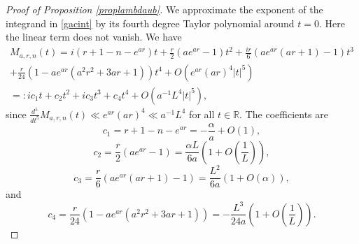 \documentclass[10pt,a4paper]{amsart}
\begin{document}
\begin{proof}[Proof of Proposition \ref{proplambdaub}]
We approximate the exponent of the integrand in \eqref{gacint} by its fourth degree Taylor polynomial around $t=0$.
Here the linear term does not vanish.
We have
\begin{multline*}
M_{a,r,n}(t) = i  \left(r+1-n-e^{ar}\right)t
+\frac{r}{2}  \left(a e^{a r}-1\right) t^2
+ \frac{i r}{6} \left(a  e^{a r} (a r+1)-1\right) t^3 \\
+ \frac{r}{24}\left(1-a  e^{a r} \left(a^2 r^2+3 a r+1\right)\right) t^4 
+O(e^{ar} (ar)^4 |t|^5) \\
=: ic_1 t+ c_{2} t^2+ i  c_{3} t^3+  c_{4} t^4 +O( a^{-1} L^4 |t|^5),
\end{multline*}
since $\frac{d^5}{dt^5} M_{a,r,n}(t) \ll e^{ar} (ar)^4 \ll a^{-1} L^4$ for all $t\in \mathbb{R}$.
The coefficients are
$$
c_1 = r+1-n-e^{ar}= -\frac{\alpha}{a} +O(1),
$$
$$
c_2= \frac{r}{2}  \left(a e^{a r}-1\right)
=\frac{\alpha L}{6a}\left(1+O\left(\frac{1}{L}\right)\right),
$$
$$
c_3= \frac{r}{6} \left(a  e^{a r} (a r+1)-1\right) = \frac{L^2}{6a} ( 1+ O(\alpha)),
$$
and
$$
c_4 =  \frac{r}{24}\left(1-a  e^{a r} \left(a^2 r^2+3 a r+1\right)\right) = -\frac{L^3}{24 a} \left(1+O\left(\frac{1}{L}\right)\right).
$$


\end{proof}
\end{document}
